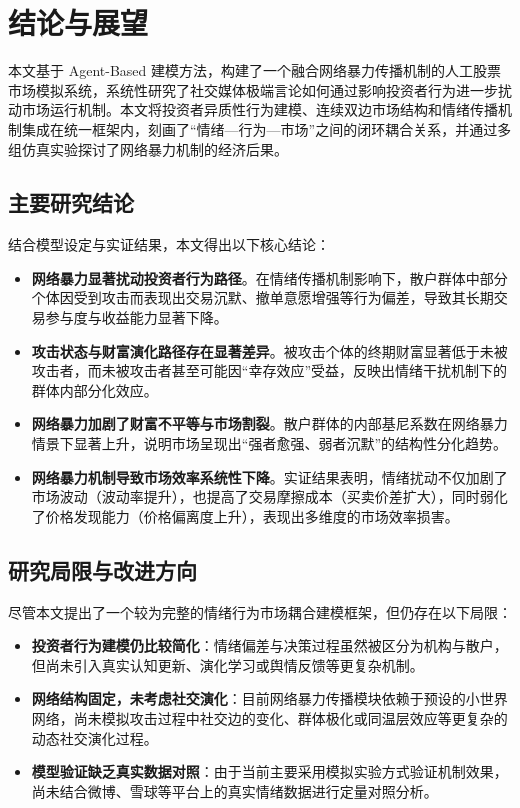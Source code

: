 
\chapter{结论与展望}

本文基于 Agent-Based 建模方法，构建了一个融合网络暴力传播机制的人工股票市场模拟系统，系统性研究了社交媒体极端言论如何通过影响投资者行为进一步扰动市场运行机制。本文将投资者异质性行为建模、连续双边市场结构和情绪传播机制集成在统一框架内，刻画了“情绪—行为—市场”之间的闭环耦合关系，并通过多组仿真实验探讨了网络暴力机制的经济后果。

\section{主要研究结论}

结合模型设定与实证结果，本文得出以下核心结论：

\begin{itemize}
  \item \textbf{网络暴力显著扰动投资者行为路径}。在情绪传播机制影响下，散户群体中部分个体因受到攻击而表现出交易沉默、撤单意愿增强等行为偏差，导致其长期交易参与度与收益能力显著下降。
  
  \item \textbf{攻击状态与财富演化路径存在显著差异}。被攻击个体的终期财富显著低于未被攻击者，而未被攻击者甚至可能因“幸存效应”受益，反映出情绪干扰机制下的群体内部分化效应。
  
  \item \textbf{网络暴力加剧了财富不平等与市场割裂}。散户群体的内部基尼系数在网络暴力情景下显著上升，说明市场呈现出“强者愈强、弱者沉默”的结构性分化趋势。
  
  \item \textbf{网络暴力机制导致市场效率系统性下降}。实证结果表明，情绪扰动不仅加剧了市场波动（波动率提升），也提高了交易摩擦成本（买卖价差扩大），同时弱化了价格发现能力（价格偏离度上升），表现出多维度的市场效率损害。
\end{itemize}

\section{研究局限与改进方向}

尽管本文提出了一个较为完整的情绪行为市场耦合建模框架，但仍存在以下局限：

\begin{itemize}
  \item \textbf{投资者行为建模仍比较简化}：情绪偏差与决策过程虽然被区分为机构与散户，但尚未引入真实认知更新、演化学习或舆情反馈等更复杂机制。
  
  \item \textbf{网络结构固定，未考虑社交演化}：目前网络暴力传播模块依赖于预设的小世界网络，尚未模拟攻击过程中社交边的变化、群体极化或同温层效应等更复杂的动态社交演化过程。
  
  \item \textbf{模型验证缺乏真实数据对照}：由于当前主要采用模拟实验方式验证机制效果，尚未结合微博、雪球等平台上的真实情绪数据进行定量对照分析。
\end{itemize}

